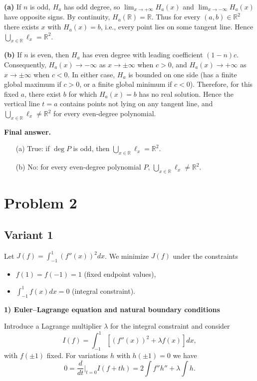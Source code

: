 \documentclass[12pt,a4paper]{article}
\theoremstyle{definition}
\begin{document}
    \textbf{(a)} If $n$ is odd, $H_a$ has odd degree, so $\lim_{x\to+\infty} H_a(x)$ and $\lim_{x\to-\infty} H_a(x)$ have opposite signs. By continuity, $H_a(\mathbb{R}) = \mathbb{R}$. Thus for every $(a, b) \in \mathbb{R}^2$ there exists $x$ with $H_a(x) = b$, i.e., every point lies on some tangent line. Hence $\bigcup_{x\in\mathbb{R}} \ell_x = \mathbb{R}^2$.

    \textbf{(b)} If $n$ is even, then $H_a$ has even degree with leading coefficient $(1 - n)c$. Consequently, $H_a(x) \to -\infty$ as $x \to \pm\infty$ when $c > 0$, and $H_a(x) \to +\infty$ as $x \to \pm\infty$ when $c < 0$. In either case, $H_a$ is bounded on one side (has a finite global maximum if $c > 0$, or a finite global minimum if $c < 0$). Therefore, for this fixed $a$, there exist $b$ for which $H_a(x) = b$ has no real solution. Hence the vertical line $t = a$ contains points not lying on any tangent line, and $\bigcup_{x\in\mathbb{R}} \ell_x \neq \mathbb{R}^2$ for every even-degree polynomial.

    \textbf{Final answer.}
    \begin{itemize}
        \item[(a)] True: if $\deg P$ is odd, then $\bigcup_{x\in\mathbb{R}} \ell_x = \mathbb{R}^2$.
        \item[(b)] No: for every even-degree polynomial $P$, $\bigcup_{x\in\mathbb{R}} \ell_x \neq \mathbb{R}^2$.
    \end{itemize}

    \section{Problem 2}
    \subsection{Variant 1}
    Let $J(f) = \int_{-1}^{1} (f''(x))^2 dx$. We minimize $J(f)$ under the constraints
    \begin{itemize}
        \item $f(1) = f(-1) = 1$ (fixed endpoint values),
        \item $\int_{-1}^{1} f(x) dx = 0$ (integral constraint).
    \end{itemize}

    \textbf{1) Euler–Lagrange equation and natural boundary conditions}

    Introduce a Lagrange multiplier $\lambda$ for the integral constraint and consider
    $$I(f) = \int_{-1}^{1} [(f''(x))^2 + \lambda f(x)] dx,$$
    with $f(\pm 1)$ fixed. For variations $h$ with $h(\pm 1) = 0$ we have
    $$0 = \frac{d}{dt}\bigg|_{t=0} I(f + t h) = 2 \int f'' h'' + \lambda \int h.$$
\end{document}
